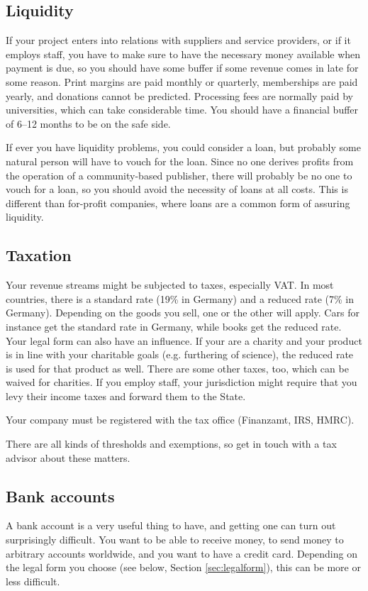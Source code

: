 \documentclass[nonflat,modfonts,output=book] {langsci/langscibook}
\begin{document}
\subsection{Liquidity}
If your project enters into relations with suppliers and service providers, or if it employs staff, you have to make sure to have the necessary money available when payment is due, so you should have some buffer if some revenue comes in late for some reason. Print margins are paid monthly or quarterly, memberships are paid yearly, and donations cannot be predicted. Processing fees are normally paid by universities, which can take considerable time. You should have a financial buffer of 6--12 months to be on the safe side. 

If ever you have liquidity problems, you could consider a loan, but probably some natural person will have to vouch for the loan. Since no one derives profits from the operation of a community-based publisher, there will probably be no one to vouch for a loan, so you should avoid the necessity of loans at all costs. This is different than for-profit companies, where loans are a common form of assuring liquidity. 
   
\subsection{Taxation}
Your revenue streams might be subjected to taxes, especially VAT. In most countries, there is a standard rate (19\% in Germany) and a reduced rate (7\% in Germany). Depending on the goods you sell, one or the other will apply. Cars for instance get the standard rate in Germany, while books get the reduced rate. Your legal form can also have an influence. If your are a charity and your product is in line with your charitable goals (e.g. furthering of science), the reduced rate is used for that product as well. There are some other taxes, too, which can be waived for charities. If you employ staff, your jurisdiction might require that you levy their income taxes and forward them to the State.

Your company must be registered with the tax office (Finanzamt, IRS, HMRC).

There are all kinds of thresholds and exemptions, so get in touch with a tax advisor about these matters. 

\subsection{Bank accounts}
A bank account is a very useful thing to have, and getting one can turn out surprisingly difficult. You want to be able to receive money, to send money to arbitrary accounts worldwide, and you want to have a credit card. Depending on the legal form you choose (see below, Section \ref{sec:legalform}), this can be more or less difficult. 
\end{document}
